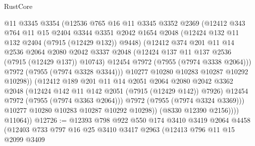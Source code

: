 \begin{lexlean}{RustCore}
\begin{coremodule}
                      @11
                      @3345
                      @3354
                      (@12536
                        @765
                        @16
                        @11
                        @3345
                        @3352
                        @2369
                        (@12412
                          @343
                          @764
                          @11
                          @15
                          @2404
                          @3344
                          @3351
                          @2042
                          @1654
                          @2048
                          (@12424 @132 @11 @132 @2404 (@7915 (@12429 @132)) @9448)
                          (@12412
                            @374
                            @201
                            @11
                            @14
                            @2536
                            @2064
                            @2080
                            @2042
                            @3337
                            @2048
                            (@12424 @137 @11 @137 @2536 (@7915 (@12429 @137)) @10743)
                            @12454
                            @7972
                            (@7955 (@7974 @3338 @2064)))
                          @7972
                          (@7955 (@7974 @3328 @3344)))
                        @10277
                        @10280
                        @10283
                        @10287
                        @10292
                        @10298))
                    (@12412
                      @189
                      @201
                      @11
                      @14
                      @2051
                      @2064
                      @2080
                      @2042
                      @3362
                      @2048
                      (@12424 @142 @11 @142 @2051 (@7915 (@12429 @142)) @7926)
                      @12454
                      @7972
                      (@7955 (@7974 @3363 @2064)))
                    @7972
                    (@7955 (@7974 @3324 @3369)))
                  @10277
                  @10280
                  @10283
                  @10287
                  @10292
                  @10298))
              (@8330 @12390 @2156))))
        @11064))
@12726 := @12393
    @798
    @922
    @550
    @174
    @3410
    @3419
    @2064
    @4458
    (@12403
      @733
      @797
      @16
      @25
      @3410
      @3417
      @2963
      (@12413
        @796
        @11
        @15
        @2099
        @3409

\end{coremodule}
\end{lexlean}
